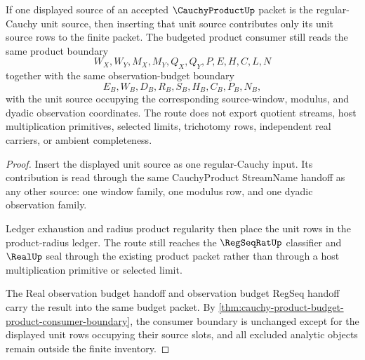 \begin{theorem}
\label{thm:cauchy-product-budget-product-unit-route}
If one displayed source of an accepted $\CauchyProductUp$ packet is the regular-Cauchy unit source, then inserting that unit source contributes only its unit source rows to the finite packet. The budgeted product consumer still reads the same product boundary
$$
W_X,W_Y,M_X,M_Y,Q_X,Q_Y,P,E,H,C,L,N
$$
together with the same observation-budget boundary
$$
E_B,W_B,D_B,R_B,S_B,H_B,C_B,P_B,N_B,
$$
with the unit source occupying the corresponding source-window, modulus, and dyadic observation coordinates. The route does not export quotient streams, host multiplication primitives, selected limits, trichotomy rows, independent real carriers, or ambient completeness.
\end{theorem}
\begin{proof}
Insert the displayed unit source as one regular-Cauchy input. Its contribution is read through the same CauchyProduct StreamName handoff as any other source: one window family, one modulus row, and one dyadic observation family.

Ledger exhaustion and radius product regularity then place the unit rows in the product-radius ledger. The route still reaches the $\RegSeqRatUp$ classifier and $\RealUp$ seal through the existing product packet rather than through a host multiplication primitive or selected limit.

The Real observation budget handoff and observation budget RegSeq handoff carry the result into the same budget packet. By \autoref{thm:cauchy-product-budget-product-consumer-boundary}, the consumer boundary is unchanged except for the displayed unit rows occupying their source slots, and all excluded analytic objects remain outside the finite inventory.
\end{proof}

